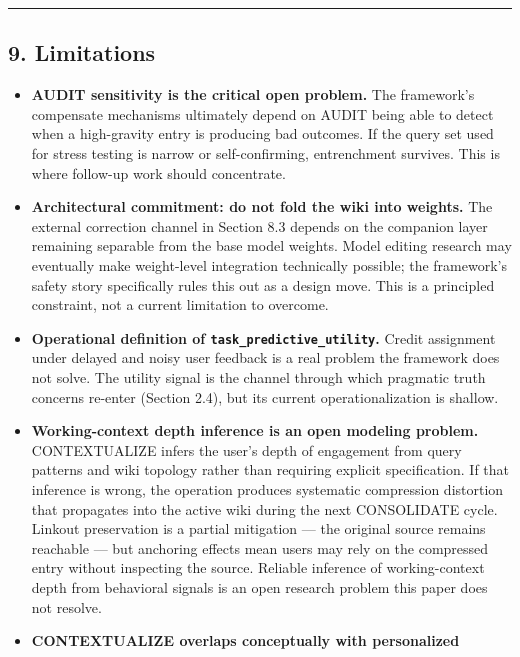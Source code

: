 \documentclass[
  11pt,
]{article}
\providecommand{\tightlist}{%
  \setlength{\itemsep}{0pt}\setlength{\parskip}{0pt}}
\begin{document}
\begin{center}\rule{0.5\linewidth}{0.5pt}\end{center}

\hypertarget{limitations}{%
\subsection{9. Limitations}\label{limitations}}

\begin{itemize}
\tightlist
\item
  \textbf{AUDIT sensitivity is the critical open problem.} The
  framework's compensate mechanisms ultimately depend on AUDIT being
  able to detect when a high-gravity entry is producing bad outcomes. If
  the query set used for stress testing is narrow or self-confirming,
  entrenchment survives. This is where follow-up work should
  concentrate.
\item
  \textbf{Architectural commitment: do not fold the wiki into weights.}
  The external correction channel in Section 8.3 depends on the
  companion layer remaining separable from the base model weights. Model
  editing research may eventually make weight-level integration
  technically possible; the framework's safety story specifically rules
  this out as a design move. This is a principled constraint, not a
  current limitation to overcome.
\item
  \textbf{Operational definition of \texttt{task\_predictive\_utility}.}
  Credit assignment under delayed and noisy user feedback is a real
  problem the framework does not solve. The utility signal is the
  channel through which pragmatic truth concerns re-enter (Section 2.4),
  but its current operationalization is shallow.
\item
  \textbf{Working-context depth inference is an open modeling problem.}
  CONTEXTUALIZE infers the user's depth of engagement from query
  patterns and wiki topology rather than requiring explicit
  specification. If that inference is wrong, the operation produces
  systematic compression distortion that propagates into the active wiki
  during the next CONSOLIDATE cycle. Linkout preservation is a partial
  mitigation --- the original source remains reachable --- but anchoring
  effects mean users may rely on the compressed entry without inspecting
  the source. Reliable inference of working-context depth from
  behavioral signals is an open research problem this paper does not
  resolve.
\item
  \textbf{CONTEXTUALIZE overlaps conceptually with personalized
}
\end{itemize}
\end{document}
